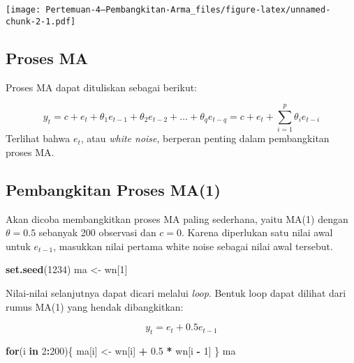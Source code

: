 \documentclass[
]{article}
\newenvironment{Shaded}{\begin{snugshade}}{\end{snugshade}}
\newcommand{\ControlFlowTok}[1]{\textcolor[rgb]{0.13,0.29,0.53}{\textbf{#1}}}
\newcommand{\DecValTok}[1]{\textcolor[rgb]{0.00,0.00,0.81}{#1}}
\newcommand{\FloatTok}[1]{\textcolor[rgb]{0.00,0.00,0.81}{#1}}
\newcommand{\FunctionTok}[1]{\textcolor[rgb]{0.13,0.29,0.53}{\textbf{#1}}}
\newcommand{\NormalTok}[1]{#1}
\newcommand{\OtherTok}[1]{\textcolor[rgb]{0.56,0.35,0.01}{#1}}
\newcommand{\SpecialCharTok}[1]{\textcolor[rgb]{0.81,0.36,0.00}{\textbf{#1}}}
\begin{document}
\texttt{[image: Pertemuan-4---Pembangkitan-Arma\_files/figure-latex/unnamed-chunk-2-1.pdf]}

\subsection{Proses MA}\label{proses-ma}

Proses MA dapat dituliskan sebagai berikut:

\[
y_{t} = c + e_t + \theta_{1}e_{t-1} + \theta_{2}e_{t-2} + \dots + \theta_{q}e_{t-q} = c+{e_t+\sum_{i=1}^p \theta_ie_{t-i}}
\] Terlihat bahwa \(e_t\), atau \emph{white noise}, berperan penting
dalam pembangkitan proses MA.

\subsection{Pembangkitan Proses MA(1)}\label{pembangkitan-proses-ma1}

Akan dicoba membangkitkan proses MA paling sederhana, yaitu MA(1) dengan
\(\theta = 0.5\) sebanyak 200 observasi dan \(c=0\). Karena diperlukan
satu nilai awal untuk \(e_{t-1}\), masukkan nilai pertama white noise
sebagai nilai awal tersebut.

\begin{Shaded}
\begin{Highlighting}[]
\FunctionTok{set.seed}\NormalTok{(}\DecValTok{1234}\NormalTok{)}
\NormalTok{ma }\OtherTok{\textless{}{-}}\NormalTok{ wn[}\DecValTok{1}\NormalTok{]}
\end{Highlighting}
\end{Shaded}

Nilai-nilai selanjutnya dapat dicari melalui \emph{loop}. Bentuk loop
dapat dilihat dari rumus MA(1) yang hendak dibangkitkan:

\[
y_t = e_t+0.5e_{t-1}
\]

\begin{Shaded}
\begin{Highlighting}[]
\ControlFlowTok{for}\NormalTok{(i }\ControlFlowTok{in} \DecValTok{2}\SpecialCharTok{:}\DecValTok{200}\NormalTok{)\{}
\NormalTok{   ma[i] }\OtherTok{\textless{}{-}}\NormalTok{ wn[i] }\SpecialCharTok{+} \FloatTok{0.5} \SpecialCharTok{*}\NormalTok{ wn[i }\SpecialCharTok{{-}} \DecValTok{1}\NormalTok{] }
\NormalTok{\}}
\NormalTok{ma}
\end{Highlighting}
\end{Shaded}
\end{document}
